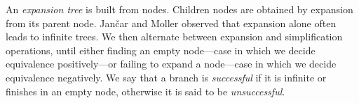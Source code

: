 An \emph{expansion tree} is built from nodes. Children nodes are
obtained by expansion from its parent node. Jan{\v{c}}ar and Moller
observed that expansion alone often leads to infinite trees. We then
alternate between expansion and simplification operations, until
either finding an empty node---case in which we decide equivalence
positively---or failing to expand a node---case in which we decide
equivalence negatively.
%
%
We say that a branch is \emph{successful} if it is infinite or
finishes in an empty node, otherwise it is said to be
\emph{unsuccessful}.

